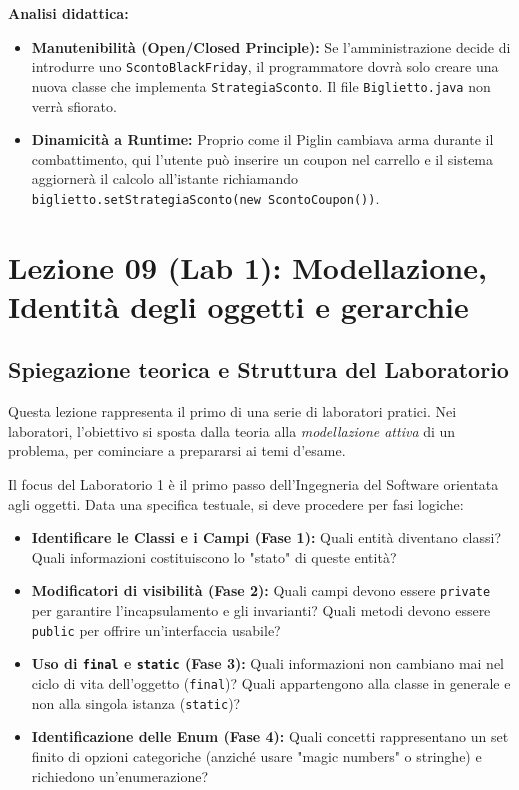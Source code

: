 \documentclass[12pt, a4paper]{article}
\begin{document}
\textbf{Analisi didattica:}
\begin{itemize}
    \item \textbf{Manutenibilità (Open/Closed Principle):} Se l'amministrazione decide di introdurre uno \texttt{ScontoBlackFriday}, il programmatore dovrà solo creare una nuova classe che implementa \texttt{StrategiaSconto}. Il file \texttt{Biglietto.java} non verrà sfiorato.
    \item \textbf{Dinamicità a Runtime:} Proprio come il Piglin cambiava arma durante il combattimento, qui l'utente può inserire un coupon nel carrello e il sistema aggiornerà il calcolo all'istante richiamando \texttt{biglietto.setStrategiaSconto(new ScontoCoupon())}.
\end{itemize}

\section{Lezione 09 (Lab 1): Modellazione, Identità degli oggetti e gerarchie}

\subsection{Spiegazione teorica e Struttura del Laboratorio}
Questa lezione rappresenta il primo di una serie di laboratori pratici. Nei laboratori, l'obiettivo si sposta dalla teoria alla \textit{modellazione attiva} di un problema, per cominciare a prepararsi ai temi d'esame. 

Il focus del Laboratorio 1 è il primo passo dell'Ingegneria del Software orientata agli oggetti. Data una specifica testuale, si deve procedere per fasi logiche:

\newpage

\begin{itemize}
    \item \textbf{Identificare le Classi e i Campi (Fase 1):} Quali entità diventano classi? Quali informazioni costituiscono lo "stato" di queste entità?
    \item \textbf{Modificatori di visibilità (Fase 2):} Quali campi devono essere \texttt{private} per garantire l'incapsulamento e gli invarianti? Quali metodi devono essere \texttt{public} per offrire un'interfaccia usabile?
    \item \textbf{Uso di \texttt{final} e \texttt{static} (Fase 3):} Quali informazioni non cambiano mai nel ciclo di vita dell'oggetto (\texttt{final})? Quali appartengono alla classe in generale e non alla singola istanza (\texttt{static})?
    \item \textbf{Identificazione delle Enum (Fase 4):} Quali concetti rappresentano un set finito di opzioni categoriche (anziché usare "magic numbers" o stringhe) e richiedono un'enumerazione?
\end{itemize}
\end{document}
